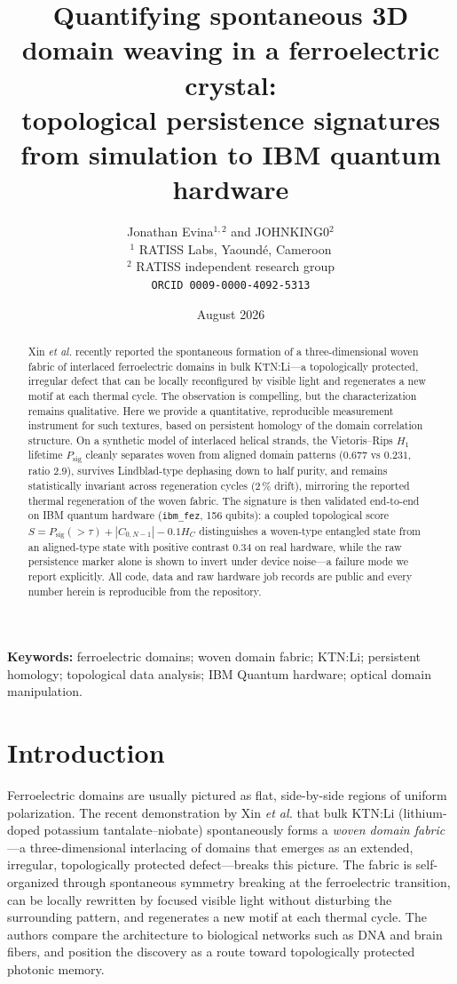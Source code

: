 \documentclass[11pt]{article}
\title{\textbf{Quantifying spontaneous 3D domain weaving in a ferroelectric crystal:\\topological persistence signatures from simulation to IBM quantum hardware}}
\author{Jonathan Evina$^{1,2}$ and JOHNKING0$^{2}$\\
\small $^{1}$ RATISS Labs, Yaound\'e, Cameroon\\
\small $^{2}$ RATISS independent research group\\
\small \texttt{ORCID 0009-0000-4092-5313}}
\date{August 2026}
\begin{document}
\maketitle

\begin{abstract}
Xin \emph{et al.} recently reported the spontaneous formation of a
three-dimensional woven fabric of interlaced ferroelectric domains in bulk
KTN:Li---a topologically protected, irregular defect that can be locally
reconfigured by visible light and regenerates a new motif at each thermal
cycle. The observation is compelling, but the characterization remains
qualitative. Here we provide a quantitative, reproducible measurement
instrument for such textures, based on persistent homology of the domain
correlation structure. On a synthetic model of interlaced helical strands,
the Vietoris--Rips $H_1$ lifetime $P_{\mathrm{sig}}$ cleanly separates woven
from aligned domain patterns ($0.677$ vs $0.231$, ratio $2.9$), survives
Lindblad-type dephasing down to half purity, and remains statistically
invariant across regeneration cycles (2\,\% drift), mirroring the reported
thermal regeneration of the woven fabric. The signature is then validated
end-to-end on IBM quantum hardware (\texttt{ibm\_fez}, 156 qubits): a coupled
topological score $S = P_{\mathrm{sig}}(>\!\tau) + |C_{0,N-1}| - 0.1 H_C$
distinguishes a woven-type entangled state from an aligned-type state with
positive contrast $0.34$ on real hardware, while the raw persistence marker
alone is shown to invert under device noise---a failure mode we report
explicitly. All code, data and raw hardware job records are public and every
number herein is reproducible from the repository.
\end{abstract}

\noindent\textbf{Keywords:} ferroelectric domains; woven domain fabric;
KTN:Li; persistent homology; topological data analysis; IBM Quantum
hardware; optical domain manipulation.

\section{Introduction}

Ferroelectric domains are usually pictured as flat, side-by-side regions of
uniform polarization. The recent demonstration by Xin \emph{et al.}
\cite{Xin2026} that bulk KTN:Li (lithium-doped potassium
tantalate--niobate) spontaneously forms a \emph{woven domain fabric}---a
three-dimensional interlacing of domains that emerges as an extended,
irregular, topologically protected defect---breaks this picture. The fabric
is self-organized through spontaneous symmetry breaking at the ferroelectric
transition, can be locally rewritten by focused visible light without
disturbing the surrounding pattern, and regenerates a new motif at each
thermal cycle. The authors compare the architecture to biological networks
such as DNA and brain fibers, and position the discovery as a route toward
topologically protected photonic memory.
\end{document}
